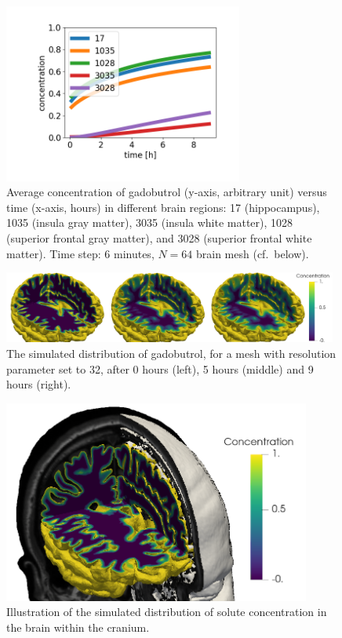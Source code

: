 \begin{figure}
  \centering
  \includegraphics[width=0.7\textwidth]{./graphics/chp6/tracer_uniform_notlump_regions_64.png}
  \caption{Average concentration of gadobutrol (y-axis, arbitrary
    unit) versus time (x-axis, hours) in different brain regions: 17
    (hippocampus), 1035 (insula gray matter), 3035 (insula white
    matter), 1028 (superior frontal gray matter), and 3028 (superior
    frontal white matter). Time step: 6 minutes, $N=64$ brain mesh
    (cf.~below).}
  \label{chp6:regions}
\end{figure}

\begin{figure}	
  \includegraphics[width=0.98\textwidth]{./graphics/chp6/Image1.png}
  \caption{The simulated distribution of gadobutrol, for a mesh with
    resolution parameter set to 32, after 0 hours (left), 5 hours
    (middle) and 9 hours (right).}
  \label{fig:chp6:numerics4}
\end{figure}
\begin{figure}	
  \includegraphics[width=0.90\textwidth]{./graphics/chp6/Image2.png}
  \caption{Illustration of the simulated distribution of solute
    concentration in the brain within the cranium.}
  \label{fig:chp6:numerics5}
\end{figure}



